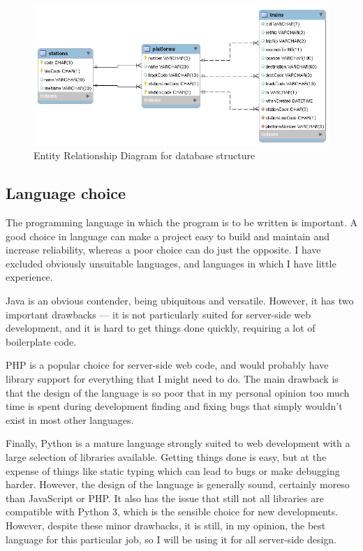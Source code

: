 \documentclass[a4paper,12pt]{article}
\begin{document}
\begin{figure}[h]
  \centering
  \includegraphics[width=\linewidth]{erd}
  \caption{Entity Relationship Diagram for database structure}
  \label{fig:erd}
\end{figure}

\subsection{Language choice}

The programming language in which the program is to be written is important. A
good choice in language can make a project easy to build and maintain and
increase reliability, whereas a poor choice can do just the opposite. I have
excluded obviously unsuitable languages, and languages in which I have little
experience.

Java is an obvious contender, being ubiquitous and versatile. However, it has
two important drawbacks --- it is not particularly suited for server-side web
development, and it is hard to get things done quickly, requiring a lot of
boilerplate code.

PHP is a popular choice for server-side web code, and would probably have
library support for everything that I might need to do. The main drawback is
that the design of the language is so poor that in my personal opinion too much
time is spent during development finding and fixing bugs that simply wouldn't
exist in most other languages.

Finally, Python is a mature language strongly suited to web development with a
large selection of libraries available. Getting things done is easy, but at the
expense of things like static typing which can lead to bugs or make debugging
harder. However, the design of the language is generally sound, certainly
moreso than JavaScript or PHP. It also has the issue that still not all
libraries are compatible with Python 3, which is the sensible choice for new
developments. However, despite these minor drawbacks, it is still, in my
opinion, the best language for this particular job, so I will be using it for
all server-side design.
\end{document}
